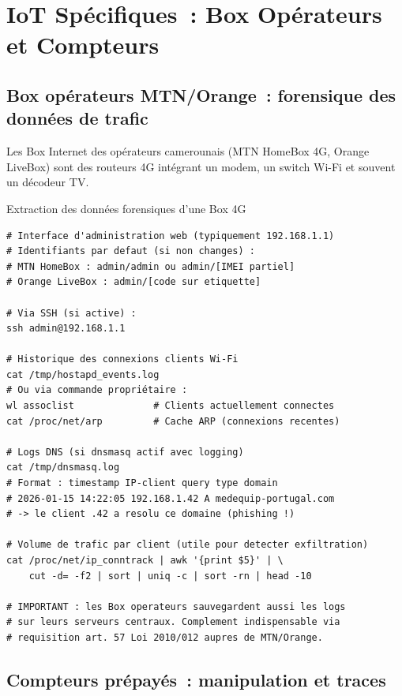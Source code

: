 \section{IoT Spécifiques~: Box Opérateurs et Compteurs}
\label{sec:iot-cameroun}

\subsection{Box opérateurs MTN/Orange~: forensique des données de trafic}

Les Box Internet des opérateurs camerounais (MTN HomeBox 4G,
Orange LiveBox) sont des routeurs 4G intégrant un modem,
un switch Wi-Fi et souvent un décodeur TV.

\begin{boxoutils}{Extraction des données forensiques d'une Box 4G}
\begin{lstlisting}[language=bash_forensique]
# Interface d'administration web (typiquement 192.168.1.1)
# Identifiants par defaut (si non changes) :
# MTN HomeBox : admin/admin ou admin/[IMEI partiel]
# Orange LiveBox : admin/[code sur etiquette]

# Via SSH (si active) :
ssh admin@192.168.1.1

# Historique des connexions clients Wi-Fi
cat /tmp/hostapd_events.log
# Ou via commande propriétaire :
wl assoclist              # Clients actuellement connectes
cat /proc/net/arp         # Cache ARP (connexions recentes)

# Logs DNS (si dnsmasq actif avec logging)
cat /tmp/dnsmasq.log
# Format : timestamp IP-client query type domain
# 2026-01-15 14:22:05 192.168.1.42 A medequip-portugal.com
# -> le client .42 a resolu ce domaine (phishing !)

# Volume de trafic par client (utile pour detecter exfiltration)
cat /proc/net/ip_conntrack | awk '{print $5}' | \
    cut -d= -f2 | sort | uniq -c | sort -rn | head -10

# IMPORTANT : les Box operateurs sauvegardent aussi les logs
# sur leurs serveurs centraux. Complement indispensable via
# requisition art. 57 Loi 2010/012 aupres de MTN/Orange.
\end{lstlisting}
\end{boxoutils}

\subsection{Compteurs prépayés~: manipulation et traces}

